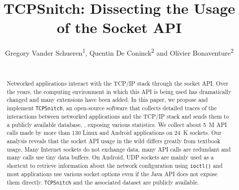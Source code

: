 \documentclass{sig-alternate-10pt}
\begin{document}
\title{TCPSnitch: Dissecting the Usage of the Socket API}


\newcommand{\tcpsnitch}{\texttt{TCPSnitch} }
\newcommand{\tcpsnitchns}{\texttt{TCPSnitch}}

\author{
\alignauthor Gregory Vander Schueren\textsuperscript{1}, Quentin De Coninck\textsuperscript{2} and Olivier Bonaventure\textsuperscript{2} \\
    \\
}
\maketitle

\begin{abstract}
Networked applications interact with the TCP/IP stack through the socket API.
Over the years, the computing environment in which this API is being used has
dramatically changed and many extensions have been added. In this paper, we
propose and implement \tcpsnitchns, an open-source software that collects
detailed traces of the interactions between networked applications and the
TCP/IP stack and sends them to a publicly
available database, \tcpsnitchwebns, exposing various statistics. We collect
about 5~M API calls made by more than 130 Linux and Android applications on
24~K sockets. Our analysis reveals that the socket API usage in the wild
differs greatly from textbook usage. Many Internet sockets do not exchange
data, many API calls are redundant and many calls use tiny data buffers. On
Android, UDP sockets are mainly used as a shortcut to retrieve information
about the network configuration using \texttt{ioctl()} and most applications
use various socket options even if the Java API does not expose them directly.
\tcpsnitch and the associated dataset are publicly available.
\end{abstract}







\newpage


\end{document}

